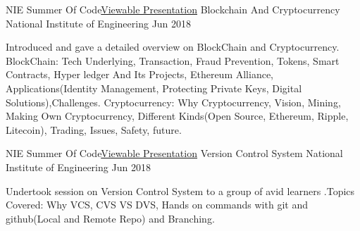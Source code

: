 

\begin{cventries}

  \cventry
    {NIE Summer Of Code\quad\textbar\quad \href{https://goo.gl/TEFiwH}{Viewable Presentation}}  %
    {Blockchain And Cryptocurrency} %
    {National Institute of Engineering} %
    {Jun 2018} %
    {
      \begin{cvitems} %
        \item {Introduced and gave a detailed overview on BlockChain and Cryptocurrency.
\newline{}BlockChain: Tech Underlying, Transaction, Fraud Prevention, Tokens, Smart Contracts, Hyper ledger And Its Projects, Ethereum Alliance, Applications(Identity Management, Protecting Private Keys, Digital Solutions),Challenges.
\newline{}Cryptocurrency: Why Cryptocurrency, Vision, Mining, Making Own Cryptocurrency, Different Kinds(Open Source, Ethereum, Ripple, Litecoin), Trading, Issues, Safety, future.
}
      \end{cvitems}
    }

  \cventry
    {NIE Summer Of Code\quad\textbar\quad \href{https://goo.gl/767dBZ}{Viewable Presentation}}%
    {Version Control System} %
    {National Institute of Engineering} %
    {Jun 2018} %
    {
      \begin{cvitems} %
        \item {Undertook session on Version Control System to a group of avid learners .\newline{}Topics Covered: Why VCS, CVS VS DVS, Hands on commands with git and github(Local and Remote Repo) and Branching.}
      \end{cvitems}
    }

\end{cventries}
